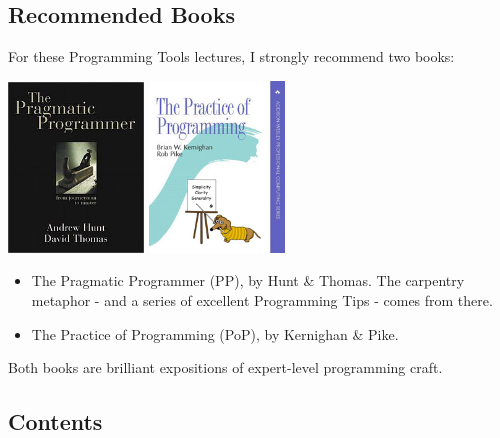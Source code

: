 \documentclass[aspectratio=169]{beamer}
\begin{document}
\subsection{Recommended Books}

\begin{frame}

For these Programming Tools lectures, I strongly recommend two books:

\begin{center}
	\includegraphics[width=0.27\textwidth]{tpp}
	\hspace{2cm}
	\includegraphics[width=0.27\textwidth]{tpop}
\end{center}

    \begin{itemize}
    \item
    \alert{The Pragmatic Programmer (PP)}, by \alert{Hunt \& Thomas}.
    The carpentry metaphor - and a series of excellent Programming Tips -
    comes from there.

    \pause
    \item
    \alert{The Practice of Programming (PoP)}, by \alert{Kernighan \& Pike}.

    \end{itemize}

    Both books are brilliant expositions of expert-level
    programming craft.
\end{frame}

\subsection{Contents}
\end{document}
